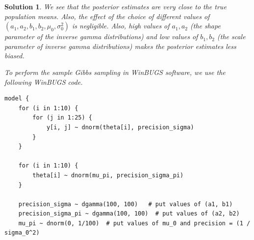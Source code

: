 \documentclass[12pt]{article}
\theoremstyle{problemstyle}
\newtheorem*{solution*}{Solution}
\begin{document}
\begin{solution*}
    \begin{table}[h]
        \centering
        \caption{Estimates of population means based on Gibbs Sampling using own custom code}
    \end{table}

    We see that the posterior estimates are very close to the true population means. Also, the effect of the choice of different values of $(a_1, a_2, b_1, b_2, \mu_0, \sigma_0^2)$ is negligible. Also, high values of $a_1, a_2$ (the shape parameter of the inverse gamma distributions) and low values of $b_1, b_2$ (the scale parameter of inverse gamma distributions) makes the posterior estimates less biased.


    To perform the sample Gibbs sampling in WinBUGS software, we use the following WinBUGS code.

\begin{lstlisting}
model {
    for (i in 1:10) {
        for (j in 1:25) {
            y[i, j] ~ dnorm(theta[i], precision_sigma)
        }
    }

    for (i in 1:10) {
        theta[i] ~ dnorm(mu_pi, precision_sigma_pi)
    }

    precision_sigma ~ dgamma(100, 100)   # put values of (a1, b1)
    precision_sigma_pi ~ dgamma(100, 100)  # put values of (a2, b2)
    mu_pi ~ dnorm(0, 1/100)  # put values of mu_0 and precision = (1 / sigma_0^2)


\end{lstlisting}
\end{solution*}
\end{document}
